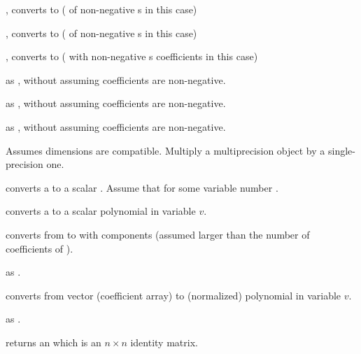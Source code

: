 , converts to  ( of non-negative
s in this case)

, converts to  ( of non-negative
s in this case)

, converts to  ( with
non-negative s coefficients in this case)

 as , without assuming
coefficients are non-negative.

 as , without assuming
coefficients are non-negative.

 as , without assuming
coefficients are non-negative.

 Assumes dimensions are compatible.
Multiply a multiprecision object by a single-precision one.









 converts a  to a
scalar . Assume that  for some variable
number .

 converts a  to a scalar
polynomial in variable $v$.

 converts from  to 
with  components (assumed larger than the number of coefficients of
).

 as .

 converts from vector (coefficient
array) to (normalized) polynomial in variable $v$.

 as .

 returns an  which is an $n \times n$
identity matrix.

